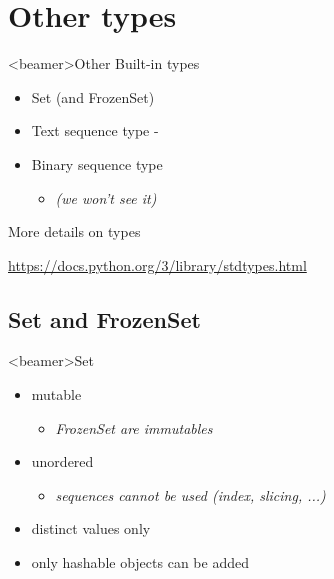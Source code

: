 \section{Other types}

\begin{frame}<beamer>{Other Built-in types}

  \begin{itemize}
    \item<1-> Set (and FrozenSet)
    \item<1-> Text sequence type - 
    \item<1-> Binary sequence type
      \begin{itemize}
      \item<2-> \textit{(we won't see it)}
      \end{itemize}
  \end{itemize}

  \begin{center}

  \bigskip

  More details on types

  \medskip

  \url{https://docs.python.org/3/library/stdtypes.html}

  \end{center}

\end{frame}

\subsection{Set and FrozenSet}

\begin{frame}<beamer>{Set}

  \begin{itemize}
    \item<1-> mutable
    \begin{itemize}
      \item<2-> \textit{FrozenSet are immutables}
    \end{itemize}
    \item<3-> unordered
    \begin{itemize}
      \item<4-> \textit{sequences cannot be used (index, slicing, ...)}
    \end{itemize}
    \item<5-> distinct values only
    \item<6-> only hashable objects can be added
  \end{itemize}

\end{frame}


